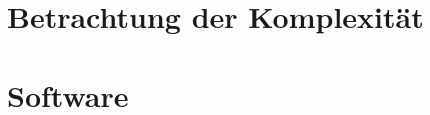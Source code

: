 \section{Betrachtung der Komplexität}
\label{sec:Komplexity2}

%
\section{Software}
\label{sec:sw}

\lipsum[1-3]



